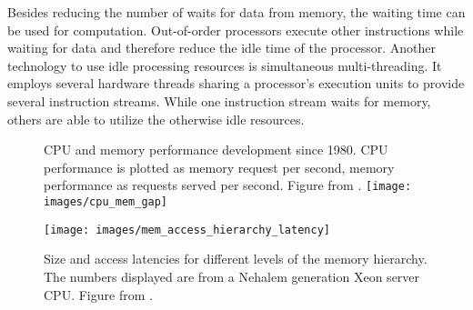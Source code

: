 Besides reducing the number of waits for data from memory, the waiting time can be
used for computation.
Out-of-order processors execute other instructions while waiting for data and
therefore reduce the idle time of the processor.
Another technology to use idle processing resources is simultaneous
multi-threading.
It employs several hardware threads sharing a processor's execution units to
provide several instruction streams.
While one instruction stream waits for memory, others are able to utilize the
otherwise idle resources.
%
\begin{figure}[h]
  \setcapindent*{1em}
  \begin{captionbeside}
    {CPU and memory performance development since 1980.
      CPU performance is plotted as memory request per second, memory
      performance as requests served per second.
      Figure from \cite[73]{hennessy_computer_2012}.}
    \texttt{[image: images/cpu\_mem\_gap]}
  \end{captionbeside}
  \label{intro:fig:cpuMemGap}
\end{figure}
%
\begin{comment}
To reduce the number of waits and obscure the gap, several levels of caches
are present on today's processors, thus decreasing the impact of memory latency.
The drawback of several layers of caches and increasing size of caches is the
access latency and the additional cost for a cache miss, when the data
requested is not in any cache layer.
Each cache level adds the time it takes to search it, to the overall
time it takes to request the data from memory.
Thus, three cache levels cost search time for the first, second, and third plus
the memory latency.
In short, larger caches decrease the miss probability, but increase the overall
memory access latency.
Figure \ref{into:fig:accessLatencies} provides and overview over size and
access times for the memory hierarchy.
The displayed access times describe the duration from issuing the request until
receiving the data.
\end{comment}
%
\begin{figure}[h]
  \texttt{[image: images/mem\_access\_hierarchy\_latency]}
  \caption{Size and access latencies for different levels of the
    memory hierarchy.
    The numbers displayed are from a Nehalem generation
    Xeon\texttrademark{} server CPU.
    Figure from \cite[72]{hennessy_computer_2012}.}
  \label{intro:fig:accessLatencies}
\end{figure}
